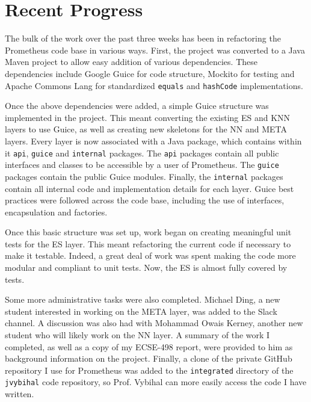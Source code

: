 \documentclass[]{article}
\begin{document}
	\section{Recent Progress} \label{sec:progress}
	
	The bulk of the work over the past three weeks has been in refactoring the Prometheus code base in various ways. First, the project was converted to a Java Maven project to allow easy addition of various dependencies. These dependencies include Google Guice for code structure, Mockito for testing and Apache Commons Lang for standardized \texttt{equals} and \texttt{hashCode} implementations.
	
	Once the above dependencies were added, a simple Guice structure was implemented in the project. This meant converting the existing ES and KNN layers to use Guice, as well as creating new skeletons for the NN and META layers. Every layer is now associated with a Java package, which contains within it \texttt{api}, \texttt{guice} and \texttt{internal} packages. The \texttt{api} packages contain all public interfaces and classes to be accessible by a user of Prometheus. The \texttt{guice} packages contain the public Guice modules. Finally, the \texttt{internal} packages contain all internal code and implementation details for each layer. Guice best practices were followed across the code base, including the use of interfaces, encapsulation and factories.
	
	Once this basic structure was set up, work began on creating meaningful unit tests for the ES layer. This meant refactoring the current code if necessary to make it testable. Indeed, a great deal of work was spent making the code more modular and compliant to unit tests. Now, the ES is almost fully covered by tests.
	
	Some more administrative tasks were also completed. Michael Ding, a new student interested in working on the META layer, was added to the Slack channel. A discussion was also had with Mohammad Owais Kerney, another new student who will likely work on the NN layer. A summary of the work I completed, as well as a copy of my ECSE-498 report, were provided to him as background information on the project. Finally, a clone of the private GitHub repository I use for Prometheus was added to the \texttt{integrated} directory of the \texttt{jvybihal} code repository, so Prof. Vybihal can more easily access the code I have written.
	
\end{document}
